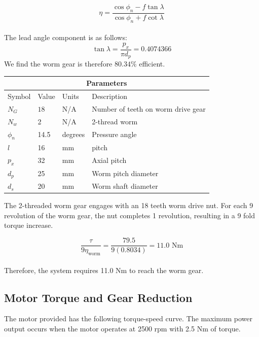 \documentclass[letterpaper,12pt]{article}
\begin{document}
	\begin{equation}
	\eta = \frac{\cos\phi_n - f\tan\lambda}{\cos\phi_n+f\cot\lambda}
	\end{equation}
\\	
The lead angle component is as follows:
	\begin{equation}
\tan \lambda =  \frac{p_x}{\pi d_p} = 0.4074366
	\end{equation}
We find the worm gear is therefore $80.34 \% $ efficient.
\begin{center}
		\begin{tabular}{ |p{2cm}||p{3cm}|p{2cm}|p{7cm}|  }
			\hline
			\multicolumn{4}{|c|}{Parameters} \\
			\hline
			Symbol& Value & Units & Description\\
			\hline
			$N_G$ & $18$ & N/A & Number of teeth on worm drive gear\\
			$N_w$ & 2 & N/A   & 2-thread worm \\
			$\phi_n$ & 14.5 & degrees &  Pressure angle\\
			$l$ & 16 & mm & pitch\\
			$p_x$ & 32 & mm & Axial pitch\\
			$d_p$ & 25 & mm & Worm pitch diameter\\
			$d_s$ & 20 & mm & Worm shaft diameter\\
			\hline
		\end{tabular}
	\end{center}
The 2-threaded worm gear engages with an 18 teeth worm drive nut. For each 9 revolution of the worm gear, the nut completes 1 revolution, resulting in a 9 fold torque increase. 

$$\frac{\tau }{9 \eta_{\text{worm}}} = \frac{79.5}{9(0.8034)} = 11.0 \text{ Nm}$$
\\
Therefore, the system requires 11.0 Nm to reach the worm gear. 

\subsection{Motor Torque and Gear Reduction}
The motor provided has the following torque-speed curve. The maximum power output occurs when the motor operates at 2500 rpm with 2.5 Nm of torque. \\
\end{document}
